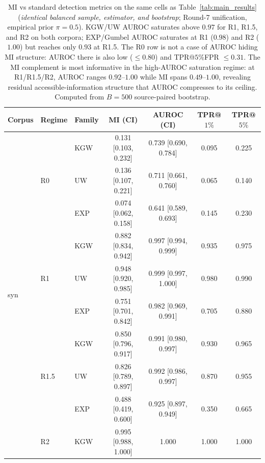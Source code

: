 \begin{table}[t]
\centering
\small
\caption{MI vs standard detection metrics on the same cells as
Table~\ref{tab:main_results} (\emph{identical balanced sample, estimator,
and bootstrap}; Round-7 unification, empirical prior $\pi{=}0.5$).
KGW/UW AUROC saturates above $0.97$ for R1, R1.5, and R2 on both corpora;
EXP/Gumbel AUROC saturates at R1 ($0.98$) and R2 ($1.00$) but reaches
only $0.93$ at R1.5. The R0 row is not a case of AUROC hiding MI
structure: AUROC there is also low ($\leq 0.80$) and TPR@$5\%$FPR
$\leq 0.31$. The MI complement is most informative in the
high-AUROC saturation regime: at R1/R1.5/R2, AUROC ranges $0.92$--$1.00$
while MI spans $0.49$--$1.00$, revealing residual accessible-information
structure that AUROC compresses to its ceiling. Computed from $B{=}500$
source-paired bootstrap.}
\label{tab:mi_vs_det}
\setlength{\tabcolsep}{4pt}
\begin{tabular}{l l l c c c c}
\toprule
Corpus & Regime & Family & MI (CI) & AUROC (CI) & TPR@$1\%$ & TPR@$5\%$ \\
\midrule
\multirow{12}{*}{syn} & \multirow{3}{*}{R0}   & KGW & 0.131 [0.103, 0.232] & 0.739 [0.690, 0.784] & 0.095 & 0.225 \\
                      &                        & UW  & 0.136 [0.107, 0.221] & 0.711 [0.661, 0.760] & 0.065 & 0.140 \\
                      &                        & EXP & 0.074 [0.062, 0.158] & 0.641 [0.589, 0.693] & 0.145 & 0.230 \\
\cmidrule(l){2-7}
                      & \multirow{3}{*}{R1}   & KGW & 0.882 [0.834, 0.942] & 0.997 [0.994, 0.999] & 0.935 & 0.975 \\
                      &                        & UW  & 0.948 [0.920, 0.985] & 0.999 [0.997, 1.000] & 0.980 & 0.990 \\
                      &                        & EXP & 0.751 [0.701, 0.842] & 0.982 [0.969, 0.991] & 0.705 & 0.880 \\
\cmidrule(l){2-7}
                      & \multirow{3}{*}{R1.5} & KGW & 0.850 [0.796, 0.917] & 0.991 [0.980, 0.997] & 0.930 & 0.965 \\
                      &                        & UW  & 0.826 [0.789, 0.897] & 0.992 [0.986, 0.997] & 0.870 & 0.955 \\
                      &                        & EXP & 0.488 [0.419, 0.600] & 0.925 [0.897, 0.949] & 0.350 & 0.665 \\
\cmidrule(l){2-7}
                      & \multirow{3}{*}{R2}   & KGW & 0.995 [0.988, 1.000] & 1.000 & 1.000 & 1.000 \\

\end{tabular}
\end{table}
